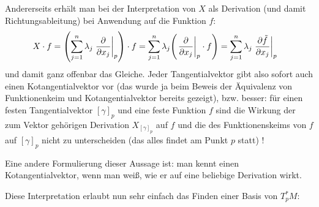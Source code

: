 \documentclass[../H_Analysis_main.tex]{subfiles}
\begin{document}
\begin{bsp}
Andererseits erhält man bei der Interpretation von $X$ als Derivation (und damit Richtungsableitung) bei Anwendung auf die Funktion $f$:
\begin{align*}
X \cdot f &= \qty(\sum_{j = 1}^n \lambda_j \eval{\pdv{x_j}}_p) \cdot f = \sum_{j = 1}^n \lambda_j \qty(\eval{\pdv{x_j}}_p \cdot f) = \sum_{j = 1}^n \lambda_j \eval{\pdv{\tilde{f}}{x_j}}_p
\end{align*}
und damit ganz offenbar das Gleiche. Jeder Tangentialvektor gibt also sofort auch einen Kotangentialvektor vor (das wurde ja beim Beweis der Äquivalenz von Funktionenkeim und Kotangentialvektor bereits gezeigt), bzw. besser: für einen festen Tangentialvektor $[\gamma]_p$ und eine feste Funktion $f$ sind die Wirkung der zum Vektor gehörigen Derivation $X_{[\gamma]_p}$ auf $f$ und die des Funktionenskeims von $f$ auf $[\gamma]_p$ nicht zu unterscheiden (das alles findet am Punkt $p$ statt) !

Eine andere Formulierung dieser Aussage ist: man kennt einen Kotangentialvektor, wenn man weiß, wie er auf eine beliebige Derivation wirkt.
\end{bsp}


Diese Interpretation erlaubt nun sehr einfach das Finden einer Basis von $T^*_p M$:
\end{document}
